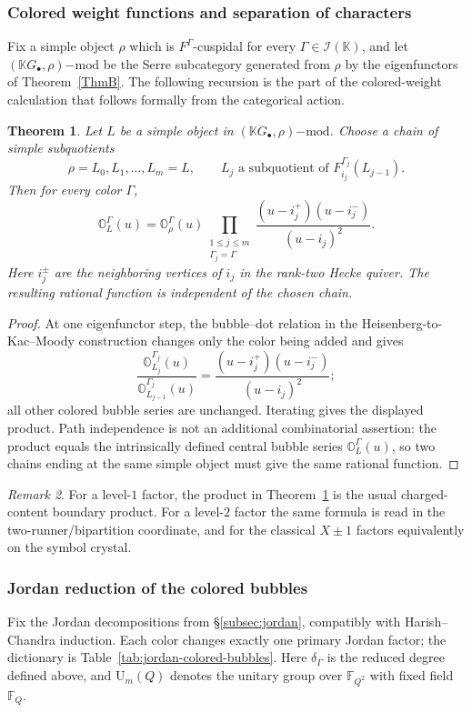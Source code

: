 \documentclass[12pt]{amsart}
\numberwithin{itemcounter}{subsection}
\theoremstyle{plain}
\newtheorem{theorem}{Theorem}[section]
\theoremstyle{definition}
\theoremstyle{remark}
\newtheorem{remark}[theorem]{Remark}
\numberwithin{equation}{section}
\def\bbK{\mathbb{K}}
\def\bbO{\mathbb{O}}
\def\calI{\mathcal{I}}
\begin{document}
\subsubsection{Colored weight functions and separation of characters}\label{sec:completeinvariants}

Fix a simple object \(\rho\) which is \(F^\Gamma\)-cuspidal for every
\(\Gamma\in\calI(\bbK)\), and let \((\bbK G_\bullet,\rho)\mathrm{-mod}\) be the
Serre subcategory generated from \(\rho\) by the eigenfunctors of
Theorem~\ref{ThmB}.  The following recursion is the part of the colored-weight
calculation that follows formally from the categorical action.

\begin{theorem}\label{TheoremC}
Let \(L\) be a simple object in
\((\bbK G_\bullet,\rho)\mathrm{-mod}\).  Choose a chain of simple
subquotients
\[
\rho=L_0,L_1,\dots,L_m=L,
\qquad
L_j\text{ a subquotient of }F^{\Gamma_j}_{i_j}(L_{j-1}).
\]
Then for every color \(\Gamma\),
\[
{
\bbO_L^\Gamma(u)=\bbO_\rho^\Gamma(u)
\prod_{\substack{1\le j\le m\\\Gamma_j=\Gamma}}
\frac{(u-i_j^+)(u-i_j^-)}{(u-i_j)^2}.}
\]
Here \(i_j^\pm\) are the neighboring vertices of \(i_j\) in the
rank-two Hecke quiver.  The resulting rational function is independent of the
chosen chain.
\end{theorem}
\begin{proof}
At one eigenfunctor step, the bubble--dot relation in the
Heisenberg-to-Kac--Moody construction changes only the color being added and
gives
\[
\frac{\bbO_{L_j}^{\Gamma_j}(u)}
     {\bbO_{L_{j-1}}^{\Gamma_j}(u)}
=
\frac{(u-i_j^+)(u-i_j^-)}{(u-i_j)^2};
\]
all other colored bubble series are unchanged.  Iterating gives the displayed
product.  Path independence is not an additional combinatorial assertion: the
product equals the intrinsically defined central bubble series
\(\bbO_L^\Gamma(u)\), so two chains ending at the same simple object must give
the same rational function.
\end{proof}

\begin{remark}
For a level-$1$ factor, the product in Theorem~\ref{TheoremC} is the usual
charged-content boundary product. For a level-$2$ factor the same formula is
read in the two-runner/bipartition coordinate, and for the classical
$X\pm1$ factors equivalently on the symbol crystal.
\end{remark}

\subsubsection{Jordan reduction of the colored bubbles}
\label{subsec:jordan-bubbles}
Fix the Jordan decompositions from \S\ref{subsec:jordan}, compatibly with
Harish--Chandra induction.  Each color changes exactly one primary Jordan
factor; the dictionary is Table~\ref{tab:jordan-colored-bubbles}.  Here
$\delta_\Gamma$ is the reduced degree defined above, and
$\mathrm U_m(Q)$ denotes the unitary group over $\mathbb F_{Q^2}$ with fixed
field $\mathbb F_Q$.
\end{document}
